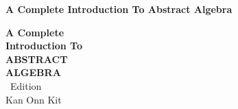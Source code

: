 \makeatletter
\newcommand*{\rom}[1]{\Ifstr{#1}{0}{0}{\expandafter\@slowromancap\romannumeral #1@}}
\makeatother

\newcommand*{\editiontext}{
    \editionnumber~Edition~\Ifstr{\buildnumber}{}{}{(Build \buildnumber)}
}

\thispagestyle{empty}
\null\vspace{4cm}
\begin{raggedleft}
    {\fontsize{24pt}{0pt}\selectfont \textbf{A Complete Introduction To Abstract Algebra}}\\
\end{raggedleft}

\begin{titlepage}
    \null\vspace{4cm}
    \begin{raggedleft}
        {\fontsize{20pt}{0pt}\selectfont \textbf{A Complete}\\\textbf{Introduction To}}\\

        \vspace{0.4cm}
        {\fontsize{48pt}{0pt}\selectfont \textbf{ABSTRACT}}\\
        \vspace{0.15cm}
        {\fontsize{48pt}{0pt}\selectfont \textbf{ALGEBRA}}\\

        \vspace{0.5cm}
        {\fontsize{16pt}{0pt}\selectfont \editiontext}\\
        
        \vspace{1.25cm}
        {\fontsize{20pt}{0pt}\selectfont Kan Onn Kit}\\
    \end{raggedleft}
    \vspace*{\fill}
\end{titlepage}

\newpage{}

